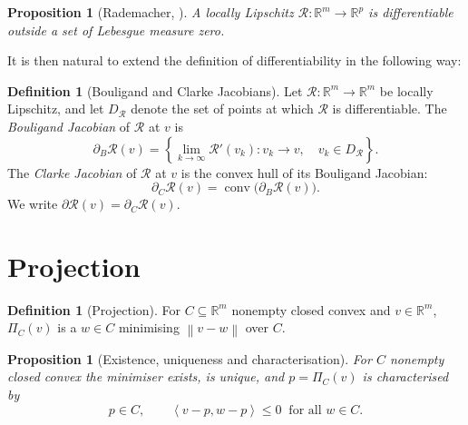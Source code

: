 \documentclass[a4paper,11pt]{book}
\theoremstyle{plain}
\newtheorem{proposition}[theorem]{Proposition}
\theoremstyle{definition}
\newtheorem{definition}[theorem]{Definition}
\theoremstyle{remark}
\numberwithin{equation}{chapter}
\numberwithin{algorithm}{chapter}
\newcommand{\R}{\mathbb{R}}
\newcommand{\proj}[2]{\Pi_{#2}\!\left(#1\right)}
\newcommand{\norm}[1]{\left\|#1\right\|}
\newcommand{\inner}[2]{\left\langle #1, #2 \right\rangle}
\newcommand{\conv}{\operatorname{conv}}
\begin{document}
	\begin{proposition}[Rademacher, \cite{EvansGariepy2015}]
		A locally Lipschitz $\mathcal{R}:\R^m\to\R^p$ is differentiable outside a set
		of Lebesgue measure zero.
	\end{proposition}
	
	It is then natural to extend the definition of differentiability in the following way:
	\begin{definition}[Bouligand and Clarke Jacobians]
		Let \(\mathcal R:\R^m\to\R^m\) be locally Lipschitz, and let
		\(D_{\mathcal R}\) denote the set of points at which \(\mathcal R\) is
		differentiable. The \emph{Bouligand Jacobian} of \(\mathcal R\) at \(v\) is
		\begin{equation}
			\partial_B\mathcal R(v)
			=
			\left\{
			\lim_{k\to\infty}\mathcal R'(v_k):
			v_k\to v,\quad v_k\in D_{\mathcal R}
			\right\}.
		\end{equation}
		The \emph{Clarke Jacobian} of \(\mathcal R\) at \(v\) is the convex hull of
		its Bouligand Jacobian:
		\begin{equation}
			\partial_C\mathcal R(v)
			=
			\conv\bigl(\partial_B\mathcal R(v)\bigr).
		\end{equation}
		We write
		\(\partial\mathcal R(v)=\partial_C\mathcal R(v)\).
	\end{definition}
	
	
	\section{Projection}
	
	
	
	\begin{definition}[Projection]
		For $C\subseteq\R^m$ nonempty closed convex and $v\in\R^m$,
		$\proj{v}{C}$ is a $w\in C$ minimising $\norm{v-w}$ over $C$.
	\end{definition}
	
	\begin{proposition}[Existence, uniqueness and characterisation]
		For $C$ nonempty closed convex the minimiser exists, is unique, and $p=\proj{v}{C}$
		is characterised by
		\begin{equation}
			p\in C,
			\qquad
			\inner{v-p}{w-p}\leq0\ \text{ for all }w\in C .
		\end{equation}
	\end{proposition}
	
\end{document}
